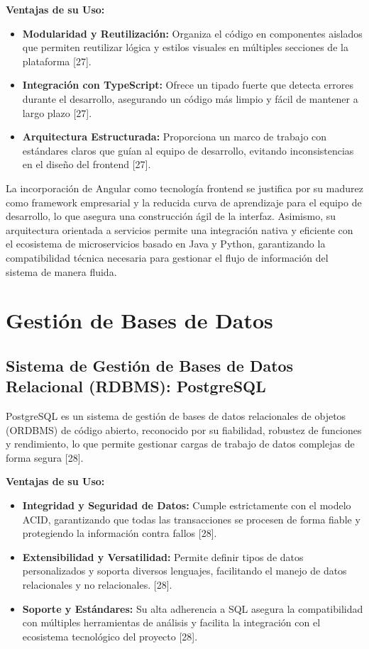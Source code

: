 \textbf{Ventajas de su Uso:}
\begin{itemize}
    \item \textbf{Modularidad y Reutilización:} Organiza el código en componentes aislados que permiten reutilizar lógica y estilos visuales en múltiples secciones de la plataforma [27].
    \item \textbf{Integración con TypeScript:} Ofrece un tipado fuerte que detecta errores durante el desarrollo, asegurando un código más limpio y fácil de mantener a largo plazo [27].
    \item \textbf{Arquitectura Estructurada:} Proporciona un marco de trabajo con estándares claros que guían al equipo de desarrollo, evitando inconsistencias en el diseño del frontend [27].
\end{itemize}

La incorporación de Angular como tecnología frontend se justifica por su madurez como framework empresarial y la reducida curva de aprendizaje para el equipo de desarrollo, lo que asegura una construcción ágil de la interfaz. Asimismo, su arquitectura orientada a servicios permite una integración nativa y eficiente con el ecosistema de microservicios basado en Java y Python, garantizando la compatibilidad técnica necesaria para gestionar el flujo de información del sistema de manera fluida.

\section{Gestión de Bases de Datos}
\subsection{Sistema de Gestión de Bases de Datos Relacional (RDBMS): PostgreSQL}
PostgreSQL es un sistema de gestión de bases de datos relacionales de objetos (ORDBMS) de código abierto, reconocido por su fiabilidad, robustez de funciones y rendimiento, lo que permite gestionar cargas de trabajo de datos complejas de forma segura [28].

\textbf{Ventajas de su Uso:}
\begin{itemize}
    \item \textbf{Integridad y Seguridad de Datos:} Cumple estrictamente con el modelo ACID, garantizando que todas las transacciones se procesen de forma fiable y protegiendo la información contra fallos [28].
    \item \textbf{Extensibilidad y Versatilidad:} Permite definir tipos de datos personalizados y soporta diversos lenguajes, facilitando el manejo de datos relacionales y no relacionales. [28].
    \item \textbf{Soporte y Estándares:} Su alta adherencia a SQL asegura la compatibilidad con múltiples herramientas de análisis y facilita la integración con el ecosistema tecnológico del proyecto [28].
\end{itemize}

